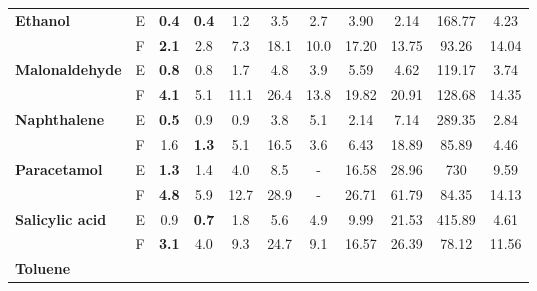 \documentclass[10pt]{article}
\begin{document}
\begin{table}[t]
{\begin{tabular}{llccccc|ccc||c}
            \hline
            \multirow{2}{*}{\textbf{Ethanol}}
             & E & \textbf{0.4}    & \textbf{0.4}        & 1.2           & 3.5           & 2.7 & 3.90            & 2.14              & 168.77          & 4.23                    \\
             & F & \textbf{2.1}    & 2.8                 & 7.3           & 18.1          & 10.0 & 17.20           & 13.75             & 93.26           & 14.04                   \\
            \hline
            \multirow{2}{*}{\textbf{Malonaldehyde}}
             & E & \textbf{0.8}    & 0.8                 & 1.7           & 4.8           & 3.9 & 5.59            & 4.62              & 119.17          & 3.74                    \\
             & F & \textbf{4.1}    & 5.1                 & 11.1          & 26.4          & 13.8 & 19.82           & 20.91             & 128.68          & 14.35                   \\
            \hline
            \multirow{2}{*}{\textbf{Naphthalene}}
             & E & \textbf{0.5}    & 0.9                 & 0.9           & 3.8           & 5.1 & 2.14            & 7.14              & 289.35          & 2.84                    \\
             & F & 1.6             & \textbf{1.3}                 & 5.1           & 16.5          & 3.6 & 6.43            & 18.89             & 85.89           & 4.46                    \\
            \hline
            \multirow{2}{*}{\textbf{Paracetamol}}
             & E & \textbf{1.3}    & 1.4                 & 4.0           & 8.5           & - & 16.58           & 28.96             & 730             & 9.59                   \\
             & F & \textbf{4.8}    & 5.9                 & 12.7          & 28.9          & - & 26.71           & 61.79             & 84.35           & 14.13                   \\
            \hline
            \multirow{2}{*}{\textbf{Salicylic acid}}
             & E & 0.9             & \textbf{0.7}        & 1.8           & 5.6           & 4.9 & 9.99            & 21.53             & 415.89          & 4.61                    \\
             & F & \textbf{3.1}    & 4.0                 & 9.3           & 24.7          & 9.1 & 16.57           & 26.39             & 78.12           & 11.56                   \\
            \hline
            \multirow{2}{*}{\textbf{Toluene}}

\end{tabular}}
\end{table}
\end{document}
